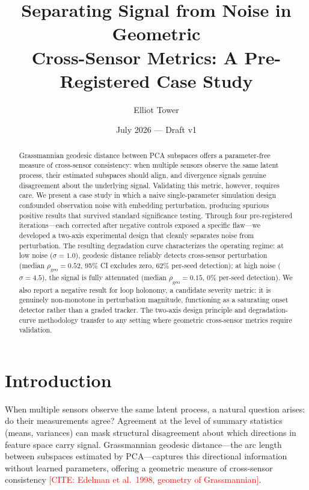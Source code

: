 \documentclass[11pt]{article}
\title{Separating Signal from Noise in Geometric\\
  Cross-Sensor Metrics: A Pre-Registered Case Study}
\author{Elliot Tower}
\date{July 2026 --- Draft v1}
\newcommand{\rhogeo}{\rho_\mathrm{geo}}
\begin{document}
\maketitle

\begin{abstract}
Grassmannian geodesic distance between PCA subspaces offers a
parameter-free measure of cross-sensor consistency: when multiple
sensors observe the same latent process, their estimated subspaces
should align, and divergence signals genuine disagreement about the
underlying signal.  Validating this metric, however, requires care.
We present a case study in which a naive single-parameter simulation
design confounded observation noise with embedding perturbation,
producing spurious positive results that survived standard
significance testing.  Through four pre-registered iterations---each
corrected after negative controls exposed a specific flaw---we
developed a two-axis experimental design that cleanly separates
noise from perturbation.  The resulting degradation curve
characterizes the operating regime: at low noise
($\sigma = 1.0$), geodesic distance reliably detects cross-sensor
perturbation (median $\rhogeo = 0.52$, 95\% CI excludes zero,
62\% per-seed detection); at high noise ($\sigma = 4.5$), the
signal is fully attenuated (median $\rhogeo = 0.15$, 0\%
per-seed detection).  We also report a negative result for loop
holonomy, a candidate severity metric: it is genuinely
non-monotone in perturbation magnitude, functioning as a
saturating onset detector rather than a graded tracker.  The
two-axis design principle and degradation-curve methodology
transfer to any setting where geometric cross-sensor metrics
require validation.
\end{abstract}

\section{Introduction}
\label{sec:intro}

When multiple sensors observe the same latent process, a natural
question arises: do their measurements agree?  Agreement at the
level of summary statistics (means, variances) can mask structural
disagreement about which directions in feature space carry signal.
Grassmannian geodesic distance---the arc length between subspaces
estimated by PCA---captures this directional information without
learned parameters, offering a geometric measure of cross-sensor
consistency
\textcolor{red}{[CITE: Edelman et al.\ 1998, geometry of
Grassmannian]}.
\end{document}
